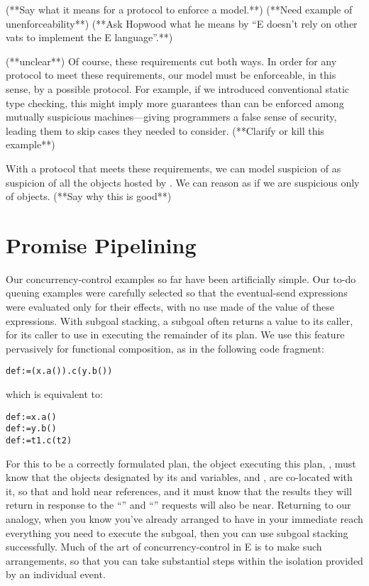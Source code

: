 \documentclass{llncs}
\begin{document}
(**Say what it means for a protocol to enforce a model.**)
(**Need example of unenforceability**)
(**Ask Hopwood what he means by ``E doesn't rely on other vats to
implement the E language''.**)

(**unclear**) Of course, these requirements cut both ways. In order
for any protocol to meet these requirements, our model must be
enforceable, in this sense, by a possible protocol. For example, if we
introduced conventional static type checking, this might imply more
guarantees than can be enforced among mutually suspicious
machines---giving programmers a false sense of security, leading them
to skip cases they needed to consider. (**Clarify or kill this
example**)

With a protocol that meets these requirements, we can model suspicion
of  as suspicion of all the objects hosted by . We can
reason as if we are suspicious only of objects. (**Say why this is
good**)

\section{Promise Pipelining}

Our concurrency-control examples so far have been artificially
simple. Our to-do queuing examples were carefully selected so that the
eventual-send expressions were evaluated only for their effects, with
no use made of the value of these expressions. With subgoal stacking,
a subgoal often returns a value to its caller, for its caller to use
in executing the remainder of its plan. We use this feature
pervasively for functional composition, as in the following code
fragment:
%
\begin{alltt}
    def  := (x.a()).c(y.b())
\end{alltt}
%
which is equivalent to:
%
\begin{alltt}
    def  := x.a() 
    def  := y.b() 
    def  := t1.c(t2)
\end{alltt}
%
For this to be a correctly formulated plan, the object executing this
plan, , must know that the objects designated by its 
and  variables,  and , are co-located with it,
so that  and  hold near
references, and it must know that the results they will return in
response to the ``'' and ``'' requests will also
be near. Returning to our analogy, when you know you've already
arranged to have in your immediate reach everything you need to
execute the subgoal, then you can use subgoal stacking
successfully. Much of the art of concurrency-control in E is to make
such arrangements, so that you can take substantial steps within the
isolation provided by an individual event.
\end{document}
